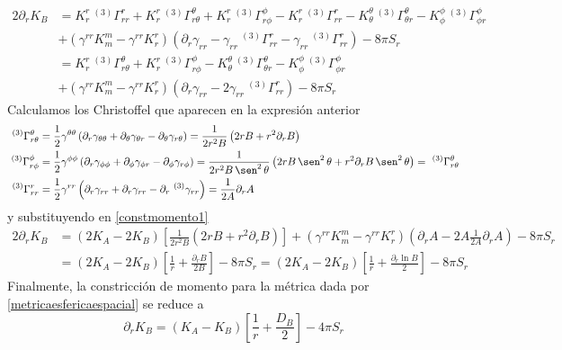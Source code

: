 \documentclass[11pt,twoside,openright,spanish]{report}
\numberwithin{equation}{chapter}
\numberwithin{figure}{chapter}
\numberwithin{table}{chapter}
\renewcommand{\sin}{\operatorname{\sen}}
\begin{document}
\begin{align}
\nonumber
2\partial_r K_B&=K^r_r\ ^{(3)}\Gamma^r_{rr}+K^r_r\ ^{(3)}\Gamma^\theta_{r\theta}+K^r_r\ ^{(3)}\Gamma^\phi_{r\phi}- K^r_r\ ^{(3)}\Gamma^r_{rr}-K^\theta_\theta\ ^{(3)}\Gamma^\theta_{\theta r}-K^\phi_\phi\ ^{(3)}\Gamma^\phi_{\phi r}\\
\nonumber
&+\left(\gamma^{rr}K_m^m -\gamma^{rr}K^r_r\right)\left(\partial_r \gamma_{rr}-\gamma_{rr}\ ^{(3)}\Gamma^r_{rr}-\gamma_{rr}\ ^{(3)}\Gamma^r_{rr}\right)-8\pi S_r\\
\nonumber
&=K^r_r\ ^{(3)}\Gamma^\theta_{r\theta}+K^r_r\ ^{(3)}\Gamma^\phi_{r\phi}-K^\theta_\theta\ ^{(3)}\Gamma^\theta_{\theta r}-K^\phi_\phi\ ^{(3)}\Gamma^\phi_{\phi r}\\
&+\left(\gamma^{rr}K_m^m -\gamma^{rr}K^r_r\right)\left(\partial_r \gamma_{rr}-2\gamma_{rr}\ ^{(3)}\Gamma^r_{rr}\right)-8\pi S_r
\label{constmomento1}
\end{align}
Calculamos los Christoffel que aparecen en la expresión anterior
\begin{align*}
\ ^{(3)}\Gamma^\theta_{r\theta}&=\frac{1}{2}\gamma^{\theta\theta}\left(\partial_r\gamma_{\theta\theta}+\partial_\theta\gamma_{\theta r}-\partial_\theta \gamma_{r\theta}\right)=\frac{1}{2r^2B}\left(2rB+r^2\partial_rB\right)\\
\ ^{(3)}\Gamma^\phi_{r\phi}&=\frac{1}{2}\gamma^{\phi\phi}\left(\partial_r\gamma_{\phi\phi}+\partial_\phi\gamma_{\phi r}-\partial_\phi \gamma_{r\phi}\right)=\frac{1}{2r^2B\sin^2\theta}\left(2rB\sin^2\theta+r^2\partial_rB\sin^2\theta\right)=\ ^{(3)}\Gamma^\theta_{r\theta}\\
\ ^{(3)}\Gamma^r_{rr}&=\frac{1}{2}\gamma^{rr}\left(\partial_r\gamma_{rr}+\partial_r\gamma_{r r}-\partial_r\ ^{(3)}\gamma_{rr}\right)=\frac{1}{2A}\partial_r A\\
\end{align*}
y substituyendo en \eqref{constmomento1}
\begin{align*}
2\partial_r K_B&=\left(2K_A-2K_B\right)\left[\frac{1}{2r^2B}\left(2rB+r^2\partial_rB\right)\right]+\left(\gamma^{rr}K_m^m -\gamma^{rr}K^r_r\right)\left(\partial_rA-2A\frac{1}{2A}\partial_r A\right)-8\pi S_r\\
&=\left(2K_A-2K_B\right)\left[\frac{1}{r}+\frac{\partial_rB}{2B}\right]-8\pi S_r=\left(2K_A-2K_B\right)\left[\frac{1}{r}+\frac{\partial_r\ln B}{2}\right]-8\pi S_r
\end{align*}
Finalmente, la constricción de momento para la métrica dada por \eqref{metricaesfericaespacial} se reduce a 
\begin{equation}
\partial_r K_B=\left(K_A-K_B\right)\left[\frac{1}{r}+\frac{D_B}{2}\right]-4\pi S_r
\end{equation}
\end{document}
